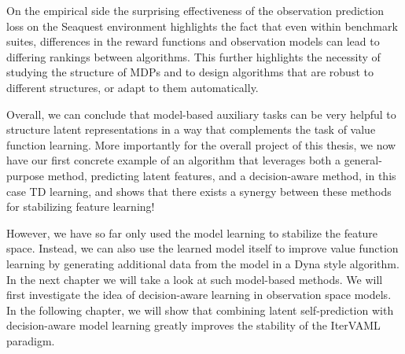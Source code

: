 On the empirical side the surprising effectiveness of the observation prediction loss on the Seaquest environment highlights the fact that even within benchmark suites, differences in the reward functions and observation models can lead to differing rankings between algorithms.
This further highlights the necessity of studying the structure of MDPs and to design algorithms that are robust to different structures, or adapt to them automatically.

Overall, we can conclude that model-based auxiliary tasks can be very helpful to structure latent representations in a way that complements the task of value function learning.
More importantly for the overall project of this thesis, we now have our first concrete example of an algorithm that leverages both a general-purpose method, predicting latent features, and a decision-aware method, in this case TD learning, and shows that there exists a synergy between these methods for stabilizing feature learning!

However, we have so far only used the model learning to stabilize the feature space.
Instead, we can also use the learned model itself to improve value function learning by generating additional data from the model in a Dyna style algorithm.
In the next chapter we will take a look at such model-based methods.
We will first investigate the idea of decision-aware learning in observation space models.
In the following chapter, we will show that combining latent self-prediction with decision-aware model learning greatly improves the stability of the IterVAML paradigm.